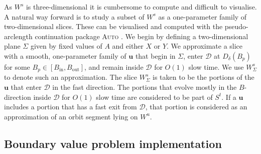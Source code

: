 \documentclass{ws-ijbc}
\begin{document}
As $W^s$ is three-dimensional it is cumbersome to compute and difficult to visualise.  A natural way forward is to study a subset of $W^s$ as a one-parameter family of two-dimensional slices.  These can be visualised and computed with the pseudo-arclength continuation package \textsc{Auto} \cite{AUTO}.  We begin by defining a two-dimensional plane $\Sigma$ given by fixed values of $A$ and either $X$ or $Y$.  We approximate a slice with a smooth, one-parameter family of $\mathbf{u}$ that begin in $\Sigma$, enter $\mathscr{D}$ at $D_{\delta}(B_p)$ for some $B_p \in [B_{\text{in}}, B_{\text{out}}]$, and remain inside $\mathscr{D}$ for $O(1)$ slow time.  We use $W^{s}_{\Sigma}$ to denote such an approximation.  The slice $W^{s}_{\Sigma}$ is taken to be the portions of the $\mathbf{u}$ that enter $\mathscr{D}$ in the fast direction.  The portions that evolve mostly in the $B$-direction inside $\mathscr{D}$ for $O(1)$ slow time are considered to be part of $S^t$.  If a $\mathbf{u}$ includes a portion that has a fast exit from $\mathscr{D}$, that portion is considered as an approximation of an orbit segment lying on $W^u$.
    
\subsection{Boundary value problem implementation}
\end{document}
